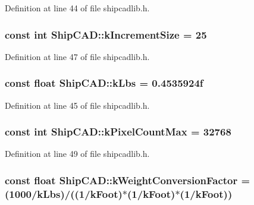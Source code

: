 Definition at line 44 of file shipcadlib.\+h.

\subsubsection[{\texorpdfstring{k\+Increment\+Size}{kIncrementSize}}]{\setlength{\rightskip}{0pt plus 5cm}const int Ship\+C\+A\+D\+::k\+Increment\+Size = 25}\hypertarget{namespaceShipCAD_a1c0de7dc4306d7908bd8c6f7ff69ecdc}{}\label{namespaceShipCAD_a1c0de7dc4306d7908bd8c6f7ff69ecdc}


Definition at line 47 of file shipcadlib.\+h.

\subsubsection[{\texorpdfstring{k\+Lbs}{kLbs}}]{\setlength{\rightskip}{0pt plus 5cm}const float Ship\+C\+A\+D\+::k\+Lbs = 0.\+4535924f}\hypertarget{namespaceShipCAD_ad6937518d9742e268b279000d1e7a509}{}\label{namespaceShipCAD_ad6937518d9742e268b279000d1e7a509}


Definition at line 45 of file shipcadlib.\+h.

\subsubsection[{\texorpdfstring{k\+Pixel\+Count\+Max}{kPixelCountMax}}]{\setlength{\rightskip}{0pt plus 5cm}const int Ship\+C\+A\+D\+::k\+Pixel\+Count\+Max = 32768}\hypertarget{namespaceShipCAD_ac8176e9d12f859826fb131b7febb8c8a}{}\label{namespaceShipCAD_ac8176e9d12f859826fb131b7febb8c8a}


Definition at line 49 of file shipcadlib.\+h.

\subsubsection[{\texorpdfstring{k\+Weight\+Conversion\+Factor}{kWeightConversionFactor}}]{\setlength{\rightskip}{0pt plus 5cm}const float Ship\+C\+A\+D\+::k\+Weight\+Conversion\+Factor = (1000/{\bf k\+Lbs})/((1/{\bf k\+Foot})$\ast$(1/{\bf k\+Foot})$\ast$(1/{\bf k\+Foot}))}\hypertarget{namespaceShipCAD_aa4319c8e7adfa68048f95c1614984036}{}\label{namespaceShipCAD_aa4319c8e7adfa68048f95c1614984036}


